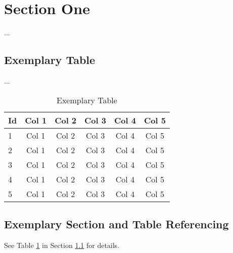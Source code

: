 \clearpage
\section{Section One}
\label{sec:Intro}
...

\subsection{Exemplary Table}
\label{subsec:Intro/table}
...

\begin{longtable}{l|ccccc}
  \caption{Exemplary Table}
  \label{table:table-1}
  \\
  \textbf{Id} & \textbf{Col 1} & \textbf{Col 2}& \textbf{Col 3} & \textbf{Col 4} & \textbf{Col 5}\\
  \hline
  1 & Col 1 & Col 2 & Col 3 & Col 4 & Col 5\\
  2 & Col 1 & Col 2 & Col 3 & Col 4 & Col 5\\
  3 & Col 1 & Col 2 & Col 3 & Col 4 & Col 5\\
  4 & Col 1 & Col 2 & Col 3 & Col 4 & Col 5\\
  5 & Col 1 & Col 2 & Col 3 & Col 4 & Col 5\\
\end{longtable}

\subsection{Exemplary Section and Table Referencing}
\label{subsec:Intro/rfs}

See Table \ref{table:table-1} in Section \ref{subsec:Intro/table}  for details.